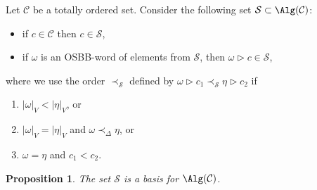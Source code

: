 \documentclass[pdftex]{sigma}
\numberwithin{equation}{section}
\newtheorem{Proposition}[Theorem]{Proposition}
 { \theoremstyle{definition}
\newtheorem{Definition}[Theorem]{Definition}
\newtheorem{Note}[Theorem]{Note}
\newtheorem{Example}[Theorem]{Example}
\newtheorem{Remark}[Theorem]{Remark} }
\begin{document}
Let $\mathcal{C}$ be a totally ordered set. Consider the following set $\mathcal{S} \subset \Alg(\mathcal{C})$:
\begin{itemize}\itemsep=0pt
 \item if $c\in \mathcal{C}$ then $c \in \mathcal{S}$,
 \item if $\omega$ is an OSBB-word of elements from $\mathcal{S}$, then $\omega \rhd c \in \mathcal{S}$,
\end{itemize}
where we use the order $\prec_{\mathcal{S}}$ defined by $\omega \rhd c_1 \prec_{\mathcal{S}} \eta \rhd c_2$ if
\begin{enumerate}\itemsep=0pt
 \item[(i)] $|\omega|_V < |\eta|_V$, or
 \item[(ii)] $|\omega|_V = |\eta|_V$ and $\omega \prec_{\Delta} \eta$, or
 \item[(iii)] $\omega = \eta$ and $c_1 < c_2$.
\end{enumerate}

\begin{Proposition}%
 The set $\mathcal{S}$ is a basis for $\Alg(\mathcal{\mathcal{C}})$.
\end{Proposition}
\end{document}
